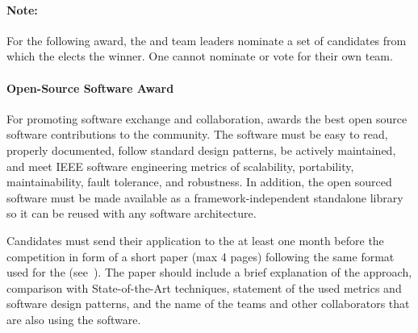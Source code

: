 \paragraph*{Note: } For the following award, the \TC{} and team leaders nominate a set of candidates from which the \EC{} elects the winner. One cannot nominate or vote for their own team.

\paragraph{Open-Source Software Award}
\label{sec:introduction:assaward}
For promoting software exchange and collaboration, \RoboCup\AtHome{} awards the best open source software contributions to the community. The software must be easy to read, properly documented, follow standard design patterns, be actively maintained, and meet IEEE software engineering metrics of scalability, portability, maintainability, fault tolerance, and robustness. In addition, the open sourced software must be made available as a framework-independent standalone library so it can be reused with any software architecture.

Candidates must send their application to the \TC{} at least one month before the competition in form of a short paper (max 4 pages) following the same format used for the \TDP{} (see~). The paper should include a brief explanation of the approach, comparison with State-of-the-Art techniques, statement of the used metrics and software design patterns, and the name of the teams and other collaborators that are also using the software.
